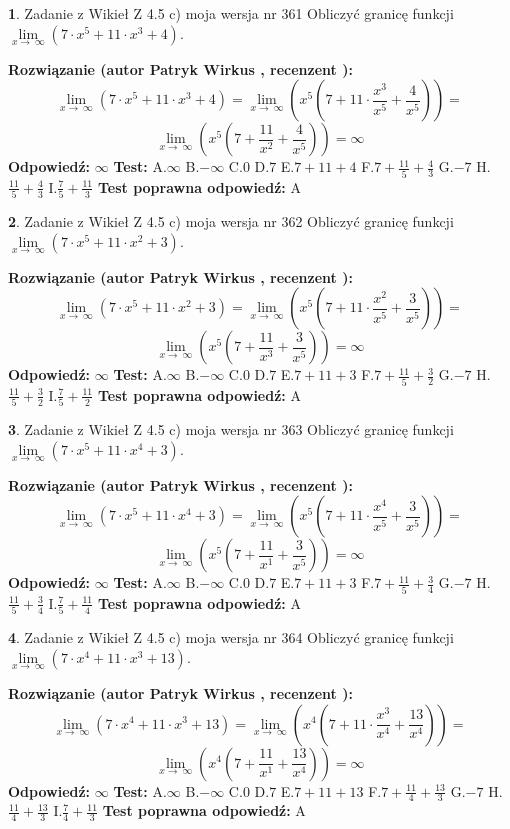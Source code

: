 \documentclass[12pt, a4paper]{article}
\theoremstyle{definition} %
\newtheorem{zad}{}
\newcommand{\zadStart}[1]{\begin{zad}#1\newline}
\newcommand{\zadStop}{\end{zad}}
\newcommand{\rozwStart}[2]{\noindent \textbf{Rozwiązanie (autor #1 , recenzent #2): }\newline}
\newcommand{\rozwStop}{\newline}
\newcommand{\odpStart}{\noindent \textbf{Odpowiedź:}\newline}
\newcommand{\odpStop}{\newline}
\newcommand{\testStart}{\noindent \textbf{Test:}\newline}
\newcommand{\testStop}{\newline}
\newcommand{\kluczStart}{\noindent \textbf{Test poprawna odpowiedź:}\newline}
\newcommand{\kluczStop}{\newline}
\begin{document}
\zadStart{Zadanie z Wikieł Z 4.5 c) moja wersja nr 361}
Obliczyć granicę funkcji  $\lim\limits_{x\to\ \infty}(7 \cdot x^{5}+11 \cdot x^{3}+4)$.
\zadStop
\rozwStart{Patryk Wirkus}{}
$$\lim\limits_{x\to\ \infty}(7 \cdot x^{5}+11 \cdot x^{3}+4) = \lim\limits_{x\to\ \infty}(x^{5}(7 +11 \cdot \frac{x^{3}}{x^{5}}+\frac{4}{x^{5}})) =$$ $$\lim\limits_{x\to\ \infty}(x^{5}(7 +\frac{11}{x^{2}}+\frac{4}{x^{5}})) =\infty$$
\rozwStop
\odpStart
$\infty$
\odpStop
\testStart
A.$\infty$ B.$-\infty$ C.$0$ D.$7$ E.$7 + 11 + 4$
F.$7+\frac{11}{5}+\frac{4}{3}$ G.$-7$
H.$\frac{11}{5}+\frac{4}{3}$
I.$\frac{7}{5}+\frac{11}{3}$
\testStop
\kluczStart
A
\kluczStop



\zadStart{Zadanie z Wikieł Z 4.5 c) moja wersja nr 362}
Obliczyć granicę funkcji  $\lim\limits_{x\to\ \infty}(7 \cdot x^{5}+11 \cdot x^{2}+3)$.
\zadStop
\rozwStart{Patryk Wirkus}{}
$$\lim\limits_{x\to\ \infty}(7 \cdot x^{5}+11 \cdot x^{2}+3) = \lim\limits_{x\to\ \infty}(x^{5}(7 +11 \cdot \frac{x^{2}}{x^{5}}+\frac{3}{x^{5}})) =$$ $$\lim\limits_{x\to\ \infty}(x^{5}(7 +\frac{11}{x^{3}}+\frac{3}{x^{5}})) =\infty$$
\rozwStop
\odpStart
$\infty$
\odpStop
\testStart
A.$\infty$ B.$-\infty$ C.$0$ D.$7$ E.$7 + 11 + 3$
F.$7+\frac{11}{5}+\frac{3}{2}$ G.$-7$
H.$\frac{11}{5}+\frac{3}{2}$
I.$\frac{7}{5}+\frac{11}{2}$
\testStop
\kluczStart
A
\kluczStop



\zadStart{Zadanie z Wikieł Z 4.5 c) moja wersja nr 363}
Obliczyć granicę funkcji  $\lim\limits_{x\to\ \infty}(7 \cdot x^{5}+11 \cdot x^{4}+3)$.
\zadStop
\rozwStart{Patryk Wirkus}{}
$$\lim\limits_{x\to\ \infty}(7 \cdot x^{5}+11 \cdot x^{4}+3) = \lim\limits_{x\to\ \infty}(x^{5}(7 +11 \cdot \frac{x^{4}}{x^{5}}+\frac{3}{x^{5}})) =$$ $$\lim\limits_{x\to\ \infty}(x^{5}(7 +\frac{11}{x^{1}}+\frac{3}{x^{5}})) =\infty$$
\rozwStop
\odpStart
$\infty$
\odpStop
\testStart
A.$\infty$ B.$-\infty$ C.$0$ D.$7$ E.$7 + 11 + 3$
F.$7+\frac{11}{5}+\frac{3}{4}$ G.$-7$
H.$\frac{11}{5}+\frac{3}{4}$
I.$\frac{7}{5}+\frac{11}{4}$
\testStop
\kluczStart
A
\kluczStop



\zadStart{Zadanie z Wikieł Z 4.5 c) moja wersja nr 364}
Obliczyć granicę funkcji  $\lim\limits_{x\to\ \infty}(7 \cdot x^{4}+11 \cdot x^{3}+13)$.
\zadStop
\rozwStart{Patryk Wirkus}{}
$$\lim\limits_{x\to\ \infty}(7 \cdot x^{4}+11 \cdot x^{3}+13) = \lim\limits_{x\to\ \infty}(x^{4}(7 +11 \cdot \frac{x^{3}}{x^{4}}+\frac{13}{x^{4}})) =$$ $$\lim\limits_{x\to\ \infty}(x^{4}(7 +\frac{11}{x^{1}}+\frac{13}{x^{4}})) =\infty$$
\rozwStop
\odpStart
$\infty$
\odpStop
\testStart
A.$\infty$ B.$-\infty$ C.$0$ D.$7$ E.$7 + 11 + 13$
F.$7+\frac{11}{4}+\frac{13}{3}$ G.$-7$
H.$\frac{11}{4}+\frac{13}{3}$
I.$\frac{7}{4}+\frac{11}{3}$
\testStop
\kluczStart
A
\kluczStop
\end{document}
